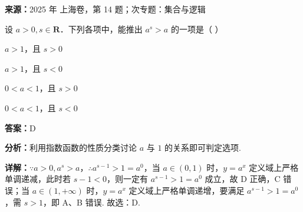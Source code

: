 \begin{question}[points=4]
\textbf{来源：}2025 年 上海卷，第 14 题；次专题：集合与逻辑\par
设 $a > 0, s \in \mathbf{R}$．下列各项中，能推出 $a^s > a$ 的一项是（ ）
\begin{choices}
  \item $a > 1$，且 $s > 0$
  \item $a > 1$，且 $s < 0$
  \item $0 < a < 1$，且 $s > 0$
  \item $0 < a < 1$，且 $s < 0$
\end{choices}
\begin{solution}
\textbf{答案：}D

\textbf{分析：}利用指数函数的性质分类讨论 $a$ 与 $1$ 的关系即可判定选项.

\textbf{详解：}$\because a > 0, a^s > a$，$\therefore a^{s-1} > 1 = a^0$，当 $a \in (0,1)$ 时，$y = a^x$ 定义域上严格单调递减，此时若 $s-1 < 0$，则一定有 $a^{s-1} > 1 = a^0$ 成立，故 D 正确，C 错误；当 $a \in (1, +\infty)$ 时，$y = a^x$ 定义域上严格单调递增，要满足 $a^{s-1} > 1 = a^0$，需 $s > 1$，即 A、B 错误. 故选：D.
\end{solution}
\end{question}

